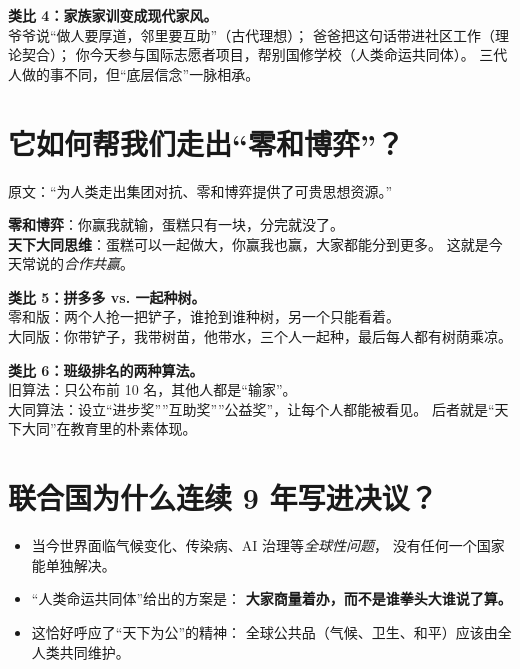 \documentclass[11pt,a4paper]{ctexart}
\begin{document}
\begin{lifeblock}
\textbf{类比 4：家族家训变成现代家风。}\\
爷爷说``做人要厚道，邻里要互助''（古代理想）；
爸爸把这句话带进社区工作（理论契合）；
你今天参与国际志愿者项目，帮别国修学校（人类命运共同体）。
三代人做的事不同，但``底层信念''一脉相承。
\end{lifeblock}

\section{它如何帮我们走出``零和博弈''？}

\begin{articleblock}
原文：``为人类走出集团对抗、零和博弈提供了可贵思想资源。''
\end{articleblock}

\begin{intuitionblock}
\textbf{零和博弈}：你赢我就输，蛋糕只有一块，分完就没了。\\
\textbf{天下大同思维}：蛋糕可以一起做大，你赢我也赢，大家都能分到更多。
这就是今天常说的\emph{合作共赢}。
\end{intuitionblock}

\begin{lifeblock}
\textbf{类比 5：拼多多 vs. 一起种树。}\\
零和版：两个人抢一把铲子，谁抢到谁种树，另一个只能看着。\\
大同版：你带铲子，我带树苗，他带水，三个人一起种，最后每人都有树荫乘凉。
\end{lifeblock}

\begin{lifeblock}
\textbf{类比 6：班级排名的两种算法。}\\
旧算法：只公布前 10 名，其他人都是``输家''。\\
大同算法：设立``进步奖''''互助奖''''公益奖''，让每个人都能被看见。
后者就是``天下大同''在教育里的朴素体现。
\end{lifeblock}

\section{联合国为什么连续 9 年写进决议？}

\begin{itemize}
  \item 当今世界面临气候变化、传染病、AI 治理等\emph{全球性问题}，
        没有任何一个国家能单独解决。
  \item ``人类命运共同体''给出的方案是：
        \textbf{大家商量着办，而不是谁拳头大谁说了算。}
  \item 这恰好呼应了``天下为公''的精神：
        全球公共品（气候、卫生、和平）应该由全人类共同维护。
\end{itemize}
\end{document}
